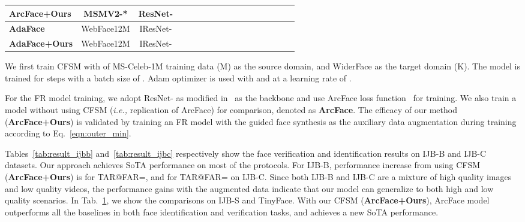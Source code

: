 \begin{table}[t]
{\begin{tabular}{l | c | c ||  c c c  c |c c  c c |c c  c c||c c}
    \textbf{ArcFace+Ours} & MSMV2-* & ResNet-  &  &  &  &  
    &  &  &  &  
    &  &  &  &  
    &  &  \\ \hline
    
        \textbf{AdaFace}~\cite{kim2022adaface}  & WebFace12M & IResNet-   &  &  &  &  
    &  &  &  &  
    &  &  &  &  
    &  &  \\
    
        \textbf{AdaFace+Ours}  & WebFace12M & IResNet-   &  &  &  &  
    &  &  &  &  
    &  &  &  &  
    &  &  \\
    
    \hline
  \end{tabular}
  }
  \vspace{0mm}
  \label{tab:result_ijbs}
\end{table}





We first train CFSM with  of MS-Celeb-1M training data (M) as the source domain, and WiderFace as the target domain (K). The model is trained for  steps with a batch size of . Adam optimizer is used with  and  at a learning rate of .


For the FR model training, we adopt ResNet- as modified in~\cite{deng2019arcface} as the backbone and use ArcFace loss function~\cite{deng2019arcface} for training. 
We also train a model without using CFSM (\emph{i.e.,} replication of ArcFace) for comparison, denoted as \textbf{ArcFace}.
The efficacy of our method (\textbf{ArcFace+Ours}) is validated by training an FR model with the guided face synthesis as the auxiliary data augmentation during training according to Eq.~\ref{eqn:outer_min}. 




Tables~\ref{tab:result_ijbb} and~\ref{tab:result_ijbc} respectively show the face verification and identification results on IJB-B and IJB-C datasets. 
Our approach achieves SoTA performance on most of the protocols.
For IJB-B, performance increase from using CFSM (\textbf{ArcFace+Ours}) is  for TAR@FAR=, and  for TAR@FAR= on IJB-C. Since both IJB-B and IJB-C are a mixture of high quality images and low quality videos, the performance gains with the augmented data indicate that our model can generalize to both high and low quality scenarios.
In Tab.~\ref{tab:result_ijbs}, we show the comparisons on IJB-S and TinyFace. With our CFSM (\textbf{ArcFace+Ours}), ArcFace model outperforms all the baselines in both face identification and verification tasks, and achieves a new SoTA performance.



